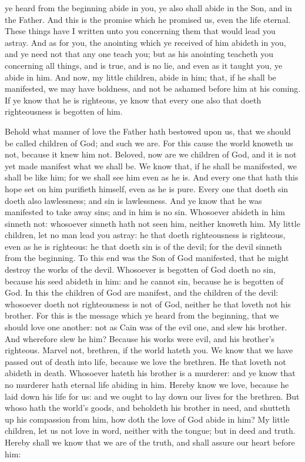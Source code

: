 ye heard from the beginning abide in you, ye also shall abide in the Son, and in the Father. And this is the promise which he promised us, even the life eternal. These things have I written unto you concerning them that would lead you astray. And as for you, the anointing which ye received of him abideth in you, and ye need not that any one teach you; but as his anointing teacheth you concerning all things, and is true, and is no lie, and even as it taught you, ye abide in him. And now, my little children, abide in him; that, if he shall be manifested, we may have boldness, and not be ashamed before him at his coming. If ye know that he is righteous, ye know that every one also that doeth righteousness is begotten of him. 

Behold what manner of love the Father hath bestowed upon us, that we should be called children of God; and such we are. For this cause the world knoweth us not, because it knew him not. Beloved, now are we children of God, and it is not yet made manifest what we shall be. We know that, if he shall be manifested, we shall be like him; for we shall see him even as he is. And every one that hath this hope set on him purifieth himself, even as he is pure. Every one that doeth sin doeth also lawlessness; and sin is lawlessness. And ye know that he was manifested to take away sins; and in him is no sin. Whosoever abideth in him sinneth not: whosoever sinneth hath not seen him, neither knoweth him. My little children, let no man lead you astray: he that doeth righteousness is righteous, even as he is righteous: he that doeth sin is of the devil; for the devil sinneth from the beginning. To this end was the Son of God manifested, that he might destroy the works of the devil. Whosoever is begotten of God doeth no sin, because his seed abideth in him: and he cannot sin, because he is begotten of God. In this the children of God are manifest, and the children of the devil: whosoever doeth not righteousness is not of God, neither he that loveth not his brother. For this is the message which ye heard from the beginning, that we should love one another: not as Cain was of the evil one, and slew his brother. And wherefore slew he him? Because his works were evil, and his brother’s righteous.  Marvel not, brethren, if the world hateth you. We know that we have passed out of death into life, because we love the brethren. He that loveth not abideth in death. Whosoever hateth his brother is a murderer: and ye know that no murderer hath eternal life abiding in him. Hereby know we love, because he laid down his life for us: and we ought to lay down our lives for the brethren. But whoso hath the world’s goods, and beholdeth his brother in need, and shutteth up his compassion from him, how doth the love of God abide in him? My little children, let us not love in word, neither with the tongue; but in deed and truth. Hereby shall we know that we are of the truth, and shall assure our heart before him: 